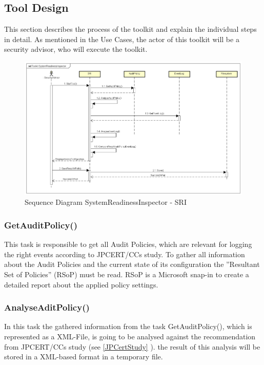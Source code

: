 \clearpage

\subsection{Tool Design}
This section describes the process of the toolkit and explain the individual steps in detail. As mentioned in the Use Cases, the actor of this toolkit will be a security advisor, who will execute the toolkit.

\begin{figure}[H]
    \centering
    \includegraphics[width=0.8\linewidth]{assets/design-tool/SequenceDiagramSRI.png}
    \caption{Sequence Diagram SystemReadinessInspector - SRI}
\end{figure}

\subsubsection{GetAuditPolicy()}
This task is responsible to get all Audit Policies, which are relevant for logging the right events according to JPCERT/CCs study. To gather all information about the Audit Policies and the current state of its configuration  the ''Resultant Set of Policies'' (RSoP) must be read. \cite{RSoP} RSoP is a Microsoft snap-in to create a detailed report about the applied policy settings. 

\subsubsection{AnalyseAditPolicy()}
In this task the gathered information from the task GetAuditPolicy(), which is represented as a XML-File, is going to be analysed against the recommendation from JPCERT/CCs study (see \ref{JPCertStudy} ). the result of this analysis will be stored in a XML-based format in a temporary file.

